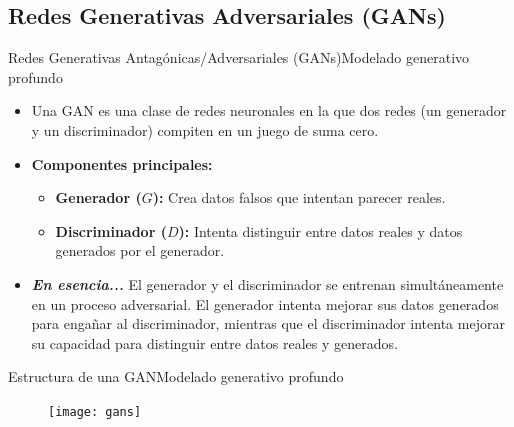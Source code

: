 \documentclass[10pt,border=3pt,tikz]{beamer}
\begin{document}
    \subsection{Redes Generativas Adversariales (GANs)}
    
    \begin{frame}{Redes Generativas Antagónicas/Adversariales (GANs)}{Modelado generativo profundo}
        \begin{itemize}
            \item Una GAN es una clase de redes neuronales en la que dos redes (un generador y un discriminador) compiten en un juego de suma cero.
            \item \textbf{Componentes principales:} 
            \begin{itemize}
                \item \textbf{Generador ($G$):} Crea datos falsos que intentan parecer reales.
                \item \textbf{Discriminador ($D$):} Intenta distinguir entre datos reales y datos generados por el generador.
            \end{itemize}
            \item \textbf{\textit{En esencia...}} El generador y el discriminador se entrenan simultáneamente en un proceso adversarial. El generador intenta mejorar sus datos generados para engañar al discriminador, mientras que el discriminador intenta mejorar su capacidad para distinguir entre datos reales y generados.
        \end{itemize}
    \end{frame}
    
    \begin{frame}{Estructura de una GAN}{Modelado generativo profundo}
        \begin{figure}
            \centering
            \texttt{[image: gans]}
        \end{figure}
    \end{frame}
    
\end{document}
